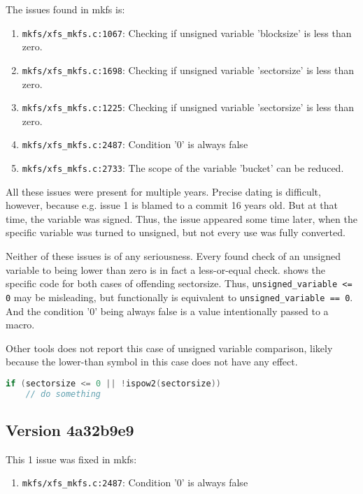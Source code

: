 The issues found in mkfs is:
\begin{enumerate}
	\item {\tt mkfs/xfs\_mkfs.c:1067}: Checking if unsigned variable 'blocksize' is less than zero.
	\item {\tt mkfs/xfs\_mkfs.c:1698}: Checking if unsigned variable
		'sectorsize' is less than zero.
	\item {\tt mkfs/xfs\_mkfs.c:1225}: Checking if unsigned variable
		'sectorsize' is less than zero.
	\item {\tt mkfs/xfs\_mkfs.c:2487}: Condition '0' is always false
	\item {\tt mkfs/xfs\_mkfs.c:2733}: The scope of the variable 'bucket' can be reduced.
\end{enumerate}

All these issues were present for multiple years. Precise dating is
difficult, however, because e.g. issue 1 is blamed to a commit 16 years
old. But at that time, the variable was signed. Thus, the issue appeared
some time later, when the specific variable was turned to unsigned, but not
every use was fully converted.

Neither of these issues is of any seriousness. Every found check of an
unsigned variable to being lower than zero is in fact a less-or-equal
check.  shows the specific code for both cases
of offending sectorsize. Thus, {\tt unsigned\_variable <= 0} may be
misleading, but functionally is equivalent to {\tt unsigned\_variable ==
0}.  And the condition '0' being always false is a value intentionally
passed to a macro.

Other tools does not report this case of unsigned variable comparison,
likely because the lower-than symbol in this case does not have any effect.

\begin{lstlisting}[frame=none, basicstyle=\footnotesize\ttfamily,
language=C, numbers=none, numberstyle=\tiny\color{black},caption=
{Condition in which unsigned sectorsize is tested to be less than zero.},
label={lst:results:sectorsize}]
if (sectorsize <= 0 || !ispow2(sectorsize))
	// do something
\end{lstlisting}

\subsection{Version 4a32b9e9}
This 1 issue was fixed in mkfs:
\begin{enumerate}
	\item {\tt mkfs/xfs\_mkfs.c:2487}: Condition '0' is always false
\end{enumerate}

